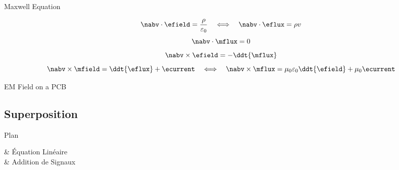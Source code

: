 \begin{frame}{Maxwell Equation}
    \begin{twocolumns}[0.3]
    \leftcol
    \rightcol
        \vspace{-8pt}
        \begin{equation}
                \nabv \cdot \efield = \frac{\rho}{\varepsilon_0}
                \hspace{1em} \Longleftrightarrow \hspace{1.0em}
                \nabv \cdot \eflux = \rho v
        \end{equation}
        \vspace{-8pt}
        \begin{equation}
            \nabv \cdot \mflux = 0
        \end{equation}
        \vspace{-10pt}
        \begin{equation}
            \nabv \times \efield = -\ddt{\mflux}
        \end{equation}
        \vspace{-10pt}
        \begin{equation}
            \nabv \times \mfield = \ddt{\eflux} + \ecurrent
            \hspace{1em} \Longleftrightarrow \hspace{1.0em}
            \nabv \times \mflux = \mu_0 \varepsilon_0 \ddt{\efield} + \mu_0 \ecurrent
        \end{equation}
 \end{twocolumns}
\end{frame}

\begin{frame}{EM Field on a PCB}
    \vspace{-20pt}
\end{frame}

\subsection[1min - Max]{Superposition }
\begin{frame}{Plan}
    \begin{makelist}[\small][1.5]
        \icon[red]{\faTimes} & Équation Linéaire\\
        \icon[red]{\faTimes} & Addition de Signaux
    \end{makelist}
\end{frame}

